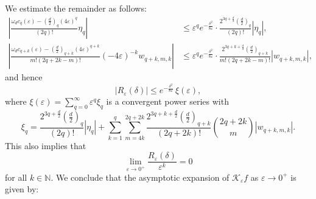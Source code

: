 \documentclass{amsart}
\theoremstyle{Theorem}
\theoremstyle{remark}
\numberwithin{equation}{section} \numberwithin{figure}{section}
\renewcommand*{\to}{\rightarrow}
\begin{document}
We estimate the remainder as follows:
\begin{align*}
\left| \frac{ \omega_d c_q(\varepsilon) - \left( \frac{d}{2} \right)_q (4\varepsilon)^q }{(2q)!}\eta_{q} \right|
&\leq \varepsilon^q e^{- \frac{\delta^2}{8\varepsilon}} \cdot \frac{ 2^{3q + \frac{d}{2}} \left( \frac{d}{2} \right)_q}{(2q)!}|\eta_{q}|, \\
\left| \frac{ \omega_d c_{q+k}(\varepsilon) - \left( \frac{d}{2} \right)_{q+k}(4\varepsilon)^{q+k} }{m!(2q+2k - m)!} (-4\varepsilon)^{-k} w_{q+k, m, k} \right|
&\leq \varepsilon^q e^{- \frac{\delta^2}{8\varepsilon}} \cdot \frac{ 2^{3q + k + \frac{d}{2}} \left( \frac{d}{2} \right)_{q+k}}{m!(2q+2k - m)!} \left| w_{q+k, m, k} \right|,
\end{align*}
and hence
\[
|R_{\varepsilon}(\delta)| \leq e^{- \frac{\delta^2}{8\varepsilon}} \, \xi(\varepsilon),
\]
where \( \xi(\varepsilon) = \sum_{q=0}^{\infty} \varepsilon^q \xi_q \) is a convergent power series with
\[
\xi_q = \frac{ 2^{3q + \frac{d}{2}} \left( \frac{d}{2} \right)_q }{(2q)!}|\eta_{q}|
+ \sum_{k=1}^{q} \sum_{m=4k}^{2q+2k} \frac{ 2^{3q + k + \frac{d}{2}} \left( \frac{d}{2} \right)_{q+k} }{(2q+2k)!}\binom{2q+2k}{m} \left| w_{q+k, m, k} \right|.
\]
This also implies that
\[
\lim_{\varepsilon \to 0^+} \frac{R_{\varepsilon}(\delta)}{\varepsilon^k} = 0
\]
for all \( k \in \mathbb{N} \). We conclude that the asymptotic expansion of \( \mathcal{K}_\varepsilon f \) as \( \varepsilon \to 0^+ \) is given by:
\end{document}
